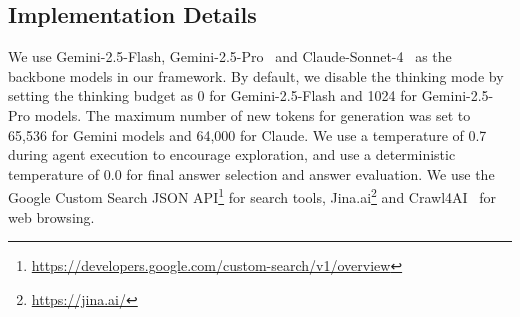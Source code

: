 \subsection{Implementation Details}\label{sec:implementation}
We use Gemini-2.5-Flash, Gemini-2.5-Pro~\citep{gemini25} and Claude-Sonnet-4~\citep{anthropic2025claude4} as the backbone models in our framework. By default, we disable the thinking mode by setting the thinking budget as 0 for Gemini-2.5-Flash and 1024 for Gemini-2.5-Pro models. The maximum number of new tokens for generation was set to 65,536 for Gemini models and 64,000 for Claude. We use a temperature of 0.7 during agent execution to encourage exploration, and use a deterministic temperature of 0.0 for final answer selection and answer evaluation. We use the Google Custom Search JSON API\footnote{\url{https://developers.google.com/custom-search/v1/overview}} for search tools, Jina.ai\footnote{\url{https://jina.ai/}} and Crawl4AI~\citep{crawl4ai2024} for web browsing.